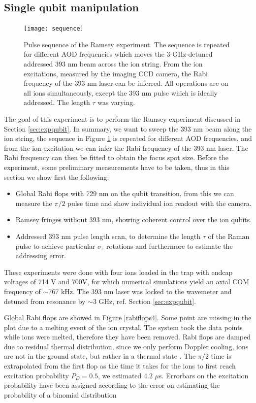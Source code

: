 \subsection{Single qubit manipulation}
\label{sec:singlequbitmanipulation}
\begin{figure}[H]
\centering
\texttt{[image: sequence]}
\caption{Pulse sequence of the Ramsey experiment. The sequence is repeated for different AOD frequencies which moves the 3-GHz-detuned addressed 393 nm beam across the ion string. From the ion excitations, measured by the imaging CCD camera, the Rabi frequency of the 393 nm laser can be inferred. All operations are on all ions simultaneously, except the 393 nm pulse which is ideally addressed. The length $\tau$ was varying.}
\label{sequence}
\end{figure}
The goal of this experiment is to perform the Ramsey experiment discussed in Section \ref{sec:expqubit}. In summary, we want to sweep the 393 nm beam along the ion string, the sequence in Figure \ref{sequence} is repeated for different AOD frequencies, and from the ion excitation we can infer the Rabi frequency of the 393 nm laser. The Rabi frequency can then be fitted to obtain the focus spot size. Before the experiment, some preliminary measurements have to be taken, thus in this section we show first the following:
\noindent\begin{itemize}
\item Global Rabi flops with 729 nm on the qubit transition, from this we can measure the $\pi/2$ pulse time and show individual ion readout with the camera.
\item Ramsey fringes without 393 nm, showing coherent control over the ion qubits.
\item Addressed 393 nm pulse length scan, to determine the length $\tau$ of the Raman pulse to achieve particular $\sigma_z$ rotations and furthermore to estimate the addressing error.
\end{itemize}
These experiments were done with four ions loaded in the trap with endcap voltages of 714 V and 700V, for which numerical simulations yield an axial COM frequency of $\sim$767 kHz. The 393 nm laser was locked to the wavemeter and detuned from resonance by $\sim$3 GHz, ref. Section \ref{sec:expqubit}.\par
Global Rabi flops are showed in Figure \ref{rabiflops4}. Some point are missing in the plot due to a melting event of the ion crystal. The system took the data points while ions were melted, therefore they have been removed. Rabi flops are damped due to residual thermal distribution, since we only perform Doppler cooling, ions are not in the ground state, but rather in a thermal state \cite{ross}. The $\pi/2$ time is extrapolated from the first flop as the time it takes for the ions to first reach excitation probability $P_D = 0.5$, we estimated 4.2 $\mu$s. Errorbars on the excitation probability have been assigned according to the error on estimating the probability of a binomial distribution \cite{mle}
